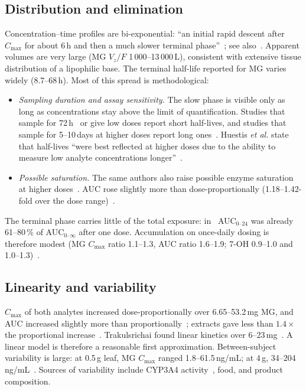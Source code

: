 \documentclass[10pt,a4paper]{article}
\begin{document}
\subsection{Distribution and elimination}
Concentration--time profiles are bi-exponential: ``an initial rapid descent after $C_{\max}$ for about 6\,h and then a
much slower terminal phase''~\cite{huestis2024}; see also~\cite{trak2015,tanna2022,mongar2024}.
Apparent volumes are very large (MG $V_z/F$ 1\,000--13\,000\,L), consistent with extensive tissue distribution
of a lipophilic base. The terminal half-life reported for MG varies widely (8.7--68\,h). Most of this spread is methodological:
\begin{itemize}
\item \emph{Sampling duration and assay sensitivity.} The slow phase is visible only as long as concentrations stay above the
limit of quantification. Studies that sample for 72\,h~\cite{mongar2024} or give low doses report short half-lives, and studies that
sample for 5--10\,days at higher doses report long ones~\cite{huestis2024,tanna2022}. Huestis \emph{et al.} state that half-lives
``were best reflected at higher doses due to the ability to measure low analyte concentrations longer''~\cite{huestis2026}.
\item \emph{Possible saturation.} The same authors also raise possible enzyme saturation at higher doses~\cite{huestis2026}.
AUC rose slightly more than dose-proportionally (1.18--1.42-fold over the dose range)~\cite{huestis2024}.
\end{itemize}
The terminal phase carries little of the total exposure: in~\cite{huestis2024} AUC$_{0\text{--}24}$ was already
61--80\,\% of AUC$_{0\text{--}\infty}$ after one dose. Accumulation on once-daily dosing is therefore modest
(MG $C_{\max}$ ratio 1.1--1.3, AUC ratio 1.6--1.9; 7-OH 0.9--1.0 and 1.0--1.3)~\cite{huestis2024}.

\subsection{Linearity and variability}
$C_{\max}$ of both analytes increased dose-proportionally over 6.65--53.2\,mg MG, and AUC increased slightly more than
proportionally~\cite{huestis2024}; extracts gave less than $1.4\times$ the proportional increase~\cite{huestis2026}. Trakulsrichai
found linear kinetics over 6--23\,mg~\cite{trak2015}. A linear model is therefore a reasonable first approximation.
Between-subject variability is large: at 0.5\,g leaf, MG $C_{\max}$ ranged 1.8--61.5\,ng/mL; at 4\,g, 34--204\,ng/mL~\cite{huestis2024}.
Sources of variability include CYP3A4 activity~\cite{mongar2024,huestis2026}, food, and product composition.
\end{document}
